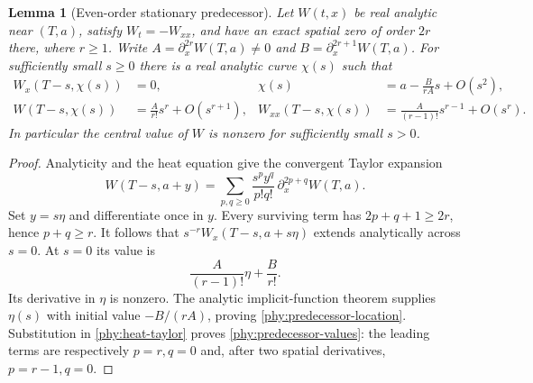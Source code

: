 \documentclass[11pt]{article}
\numberwithin{equation}{section}
\newtheorem{lemma}[theorem]{Lemma}
\theoremstyle{definition}
\theoremstyle{remark}
\begin{document}
\begin{lemma}[Even-order stationary predecessor]
\label{phy:even-predecessor}
Let $W(t,x)$ be real analytic near $(T,a)$, satisfy $W_t=-W_{xx}$, and
have an exact spatial zero of order $2r$ there, where $r\ge1$.
Write $A=\partial_x^{2r}W(T,a)\ne0$ and
$B=\partial_x^{2r+1}W(T,a)$.  For sufficiently small $s\ge0$ there is
a real analytic curve $\chi(s)$ such that
\begin{align}
 W_x(T-s,\chi(s))&=0,&
 \chi(s)&=a-\frac{B}{rA}s+O(s^2),\label{phy:predecessor-location}\\
 W(T-s,\chi(s))&=\frac{A}{r!}s^r+O(s^{r+1}),&
 W_{xx}(T-s,\chi(s))&=\frac{A}{(r-1)!}s^{r-1}+O(s^r).
 \label{phy:predecessor-values}
\end{align}
In particular the central value of $W$ is nonzero for sufficiently small
$s>0$.
\end{lemma}
\begin{proof}
Analyticity and the heat equation give the convergent Taylor expansion
\begin{equation}
 W(T-s,a+y)=\sum_{p,q\ge0}
   \frac{s^p y^q}{p!q!}\,\partial_x^{2p+q}W(T,a).
 \label{phy:heat-taylor}
\end{equation}
Set $y=s\eta$ and differentiate once in $y$.  Every surviving term has
$2p+q+1\ge2r$, hence $p+q\ge r$.  It follows that
$s^{-r}W_x(T-s,a+s\eta)$ extends analytically across $s=0$.
At $s=0$ its value is
\[
 \frac{A}{(r-1)!}\eta+\frac{B}{r!}.
\]
Its derivative in $\eta$ is nonzero.  The analytic implicit-function
theorem supplies $\eta(s)$ with initial value $-B/(rA)$, proving
\eqref{phy:predecessor-location}.  Substitution in
\eqref{phy:heat-taylor} proves \eqref{phy:predecessor-values}:
the leading terms are respectively $p=r,q=0$ and, after two spatial
derivatives, $p=r-1,q=0$.
\end{proof}
\end{document}
